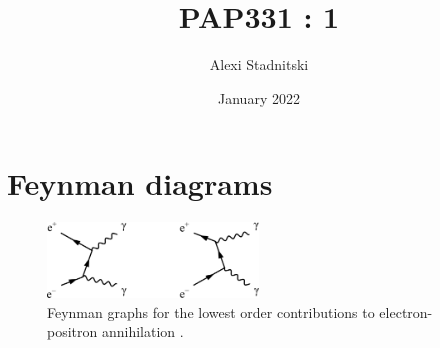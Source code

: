 \documentclass[12pt]{article}
\title{PAP331 : 1}
\author{Alexi Stadnitski}
\date{January 2022}
\begin{document}
\maketitle

\section*{Feynman diagrams}

\begin{figure}[h]
    \centering
    \includegraphics[width = 0.5\textwidth]{diag}
    \caption{Feynman graphs for the lowest order contributions to electron-positron annihilation \cite{ref01}.}
\end{figure}




\end{document}
